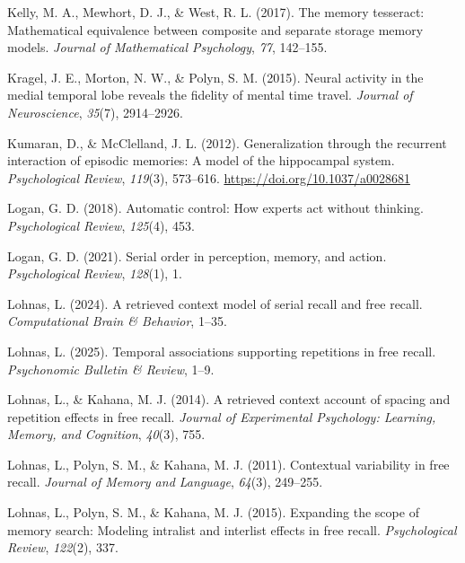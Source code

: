 \documentclass[
  man,
  floatsintext,
  longtable,
  nolmodern,
  notxfonts,
  notimes,
  draftfirst,
  colorlinks=true,linkcolor=blue,citecolor=blue,urlcolor=blue]{apa7}
\newlength{\cslhangindent}
\newenvironment{CSLReferences}[2] %
 {\begin{list}{}{%
  \setlength{\itemindent}{0pt}
  \setlength{\leftmargin}{0pt}
  \setlength{\parsep}{0pt}
  \ifodd #1
   \setlength{\leftmargin}{\cslhangindent}
   \setlength{\itemindent}{-1\cslhangindent}
  \fi
  \setlength{\itemsep}{#2\baselineskip}}}
 {\end{list}}
\begin{document}
\begin{CSLReferences}{1}{0}
Kelly, M. A., Mewhort, D. J., \& West, R. L. (2017). The memory
tesseract: Mathematical equivalence between composite and separate
storage memory models. \emph{Journal of Mathematical Psychology},
\emph{77}, 142--155.

Kragel, J. E., Morton, N. W., \& Polyn, S. M. (2015). Neural activity in
the medial temporal lobe reveals the fidelity of mental time travel.
\emph{Journal of Neuroscience}, \emph{35}(7), 2914--2926.

Kumaran, D., \& McClelland, J. L. (2012). Generalization through the
recurrent interaction of episodic memories: A model of the hippocampal
system. \emph{Psychological Review}, \emph{119}(3), 573--616.
\url{https://doi.org/10.1037/a0028681}

Logan, G. D. (2018). Automatic control: How experts act without
thinking. \emph{Psychological Review}, \emph{125}(4), 453.

Logan, G. D. (2021). Serial order in perception, memory, and action.
\emph{Psychological Review}, \emph{128}(1), 1.

Lohnas, L. (2024). A retrieved context model of serial recall and free
recall. \emph{Computational Brain \& Behavior}, 1--35.

Lohnas, L. (2025). Temporal associations supporting repetitions in free
recall. \emph{Psychonomic Bulletin \& Review}, 1--9.

Lohnas, L., \& Kahana, M. J. (2014). A retrieved context account of
spacing and repetition effects in free recall. \emph{Journal of
Experimental Psychology: Learning, Memory, and Cognition}, \emph{40}(3),
755.

Lohnas, L., Polyn, S. M., \& Kahana, M. J. (2011). Contextual
variability in free recall. \emph{Journal of Memory and Language},
\emph{64}(3), 249--255.

Lohnas, L., Polyn, S. M., \& Kahana, M. J. (2015). Expanding the scope
of memory search: Modeling intralist and interlist effects in free
recall. \emph{Psychological Review}, \emph{122}(2), 337.


\end{CSLReferences}
\end{document}
